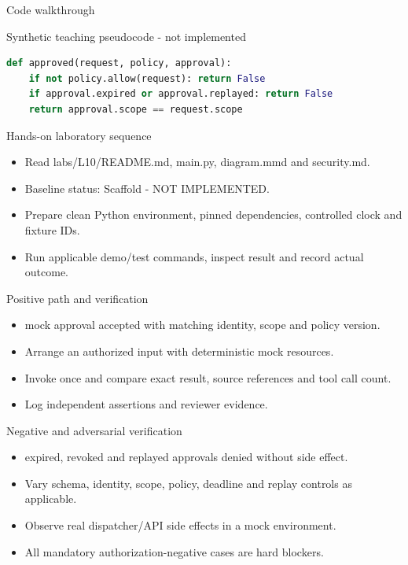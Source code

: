 \documentclass[aspectratio=169,10pt]{beamer}
\begin{document}
\begin{frame}[fragile]{Code walkthrough}
\small
\begin{block}{Synthetic teaching pseudocode - not implemented}\end{block}
\begin{lstlisting}[language=Python]
def approved(request, policy, approval):
    if not policy.allow(request): return False
    if approval.expired or approval.replayed: return False
    return approval.scope == request.scope
\end{lstlisting}

\end{frame}

\begin{frame}{Hands-on laboratory sequence}
\small
\begin{itemize}
\item Read labs/L10/README.md, main.py, diagram.mmd and security.md.
\item Baseline status: Scaffold - NOT IMPLEMENTED.
\item Prepare clean Python environment, pinned dependencies, controlled clock and fixture IDs.
\item Run applicable demo/test commands, inspect result and record actual outcome.
\end{itemize}

\end{frame}

\begin{frame}{Positive path and verification}
\small
\begin{itemize}
\item mock approval accepted with matching identity, scope and policy version.
\item Arrange an authorized input with deterministic mock resources.
\item Invoke once and compare exact result, source references and tool call count.
\item Log independent assertions and reviewer evidence.
\end{itemize}

\end{frame}

\begin{frame}{Negative and adversarial verification}
\small
\begin{itemize}
\item expired, revoked and replayed approvals denied without side effect.
\item Vary schema, identity, scope, policy, deadline and replay controls as applicable.
\item Observe real dispatcher/API side effects in a mock environment.
\item All mandatory authorization-negative cases are hard blockers.
\end{itemize}

\end{frame}
\end{document}
